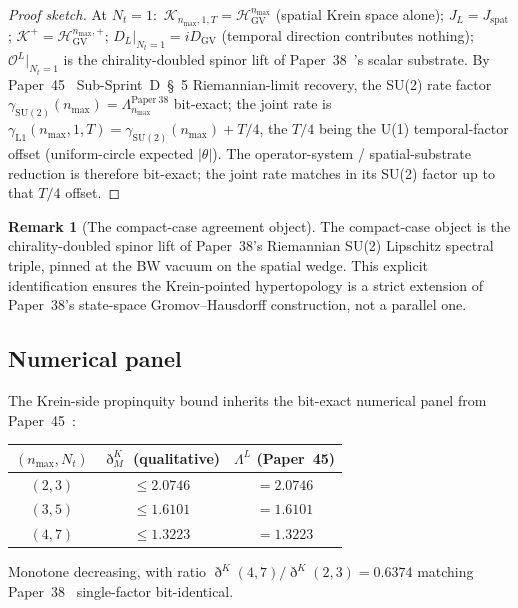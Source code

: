 \documentclass[11pt,a4paper]{article}
\theoremstyle{plain}
\theoremstyle{definition}
\newtheorem{remark}[theorem]{Remark}
\newcommand{\nmax}{n_{\max}}
\newcommand{\Nt}{N_{t}}
\newcommand{\Krein}{\mathcal{K}}
\newcommand{\Op}{\mathcal{O}}
\newcommand{\DGV}{D_{\mathrm{GV}}}
\newcommand{\DL}{D_{L}}
\newcommand{\JL}{J_{L}}
\newcommand{\HGV}{\mathcal{H}_{\mathrm{GV}}}
\newcommand{\Kplus}{\Krein^{+}}
\newcommand{\spat}{\mathrm{spat}}
\newcommand{\Lprop}{\Lambda^{L}}
\newcommand{\Dethmet}{\eth^{K}}
\begin{document}
\begin{proof}[Proof sketch]
At $\Nt = 1$:\ $\Krein_{\nmax, 1, T} = \HGV^{\nmax}$ (spatial Krein
space alone); $\JL = J_{\spat}$; $\Kplus = \HGV^{\nmax, +}$;
$\DL|_{\Nt=1} = i\DGV$ (temporal direction contributes nothing);
$\Op^{L}|_{\Nt=1}$ is the chirality-doubled spinor lift of
Paper~38~\cite{paper38}'s scalar substrate. By Paper~45~\cite{paper45}
Sub-Sprint~D~\S~5 Riemannian-limit recovery, the SU(2) rate factor
$\gamma_{\mathrm{SU(2)}}(\nmax) = \Lambda^{\mathrm{Paper~38}}_{\nmax}$
bit-exact; the joint rate is $\gamma_{\mathrm{L1}}(\nmax, 1, T) =
\gamma_{\mathrm{SU(2)}}(\nmax) + T/4$, the $T/4$ being the U(1)
temporal-factor offset (uniform-circle expected $|\theta|$). The
operator-system / spatial-substrate reduction is therefore bit-exact;
the joint rate matches in its SU(2) factor up to that $T/4$ offset.
\end{proof}

\begin{remark}[The compact-case agreement object]\label{rem:compact_object}
The compact-case object is the chirality-doubled spinor lift of
Paper~38's Riemannian SU(2) Lipschitz spectral triple, pinned at the
BW vacuum on the spatial wedge. This explicit identification ensures
the Krein-pointed hypertopology is a strict extension of
Paper~38's state-space Gromov--Hausdorff construction, not a parallel one.
\end{remark}

\subsection{Numerical panel}\label{sec:numerical_panel}

The Krein-side propinquity bound inherits the bit-exact numerical
panel from Paper~45~\cite{paper45}:

\begin{center}
\begin{tabular}{ccc}
\toprule
$(\nmax, \Nt)$ & $\Dethmet_{M}$ (qualitative) & $\Lprop$ (Paper~45) \\
\midrule
$(2, 3)$ & $\le 2.0746$ & $= 2.0746$ \\
$(3, 5)$ & $\le 1.6101$ & $= 1.6101$ \\
$(4, 7)$ & $\le 1.3223$ & $= 1.3223$ \\
\bottomrule
\end{tabular}
\end{center}

Monotone decreasing, with ratio $\Dethmet(4, 7)/\Dethmet(2, 3) = 0.6374$
matching Paper~38~\cite{paper38} single-factor bit-identical.
\end{document}
